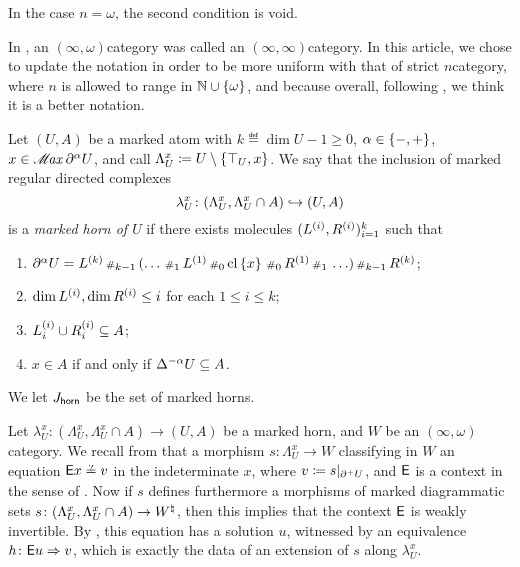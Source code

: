 \begin{rmk}
    In the case \( n = \omega \), the second condition is void.
\end{rmk}

\begin{comm}
    In \cite{chanavat2024model}, an \( (\infty, \omega) \)\nbd category was called an \( (\infty, \infty) \)\nbd category.
    In this article, we chose to update the notation in order to be more uniform with that of strict \( n \)\nbd category, where \( n \) is allowed to range in \( \mathbb{N} \cup \set{\omega} \), and because overall, following \cite{loubaton2023theory}, we think it is a better notation. 
\end{comm}

\begin{dfn} 
    Let \( (U, A) \) be a marked atom with \( k \eqdef \dim U - 1 \geq 0 \), \( \a \in \set{-, +} \), \( x \in \maxel{\bd{}{\a} U} \), and call \( \Lambda^x_U \eqdef U \setminus \set{\top_U, x} \).
    We say that the inclusion of marked regular directed complexes
    \begin{equation*}
        \lambda^x_U \colon (\Lambda^x_U, \Lambda^x_U \cap A) \incl (U, A) 
    \end{equation*}
    is a \emph{marked horn of \( U \)} if there exists molecules \( (\order{i}{L}, \order{i}{R})_{i = 1}^k \) such that
    \begin{enumerate}
        \item \( \bd{}{\a} U = \order{k}{L} \cp{k - 1} (\ldots \cp{1} \order{1}{L} \cp{0} \clset{x} \cp{0} \order{1}{R} \cp{1} \ldots) \cp{k - 1} \order{k}{R} \);
        \item \( \dim \order{i}{L}, \dim \order{i}{R} \le i \) for each \( 1 \le i \le k \);
        \item \( \gr{i}{\order{i}{L}} \cup \gr{i}{\order{i}{R}} \subseteq A \);
        \item \( x \in A \) if and only if \( \faces{}{-\a} U \subseteq A \).
    \end{enumerate}
    We let \( \Jhorn \) be the set of marked horns.
\end{dfn}

\begin{comm}
    Let \( \lambda^x_U \colon (\Lambda^x_U, \Lambda^x_U \cap A) \to (U, A) \) be a marked horn, and \( W \) be an \( (\infty, \omega) \)\nbd category.
    We recall from \cite[Comment 3.13]{chanavat2024model} that a morphism \( s \colon \Lambda^x_U \to W \) classifying in \( W \) an equation \( \fun{E}x \qeq v \) in the indeterminate \( x \), where \( v \eqdef \restr{s}{\bd{}{+}U} \), and \( \fun{E} \) is a context in the sense of \cite[3.1]{chanavat2024equivalences}.
    Now if \( s \) defines furthermore a morphisms of marked diagrammatic sets \( s \colon (\Lambda^x_U, \Lambda^x_U \cap A) \to \natmark{W} \), then this implies that the context \( \fun{E} \) is weakly invertible.
    By \cite[Lemma 5.10]{chanavat2024equivalences}, this equation has a solution \( u \), witnessed by an equivalence \( h \colon \fun{E}u \celto v \), which is exactly the data of an extension of \( s \) along \( \lambda^x_U \).
\end{comm}

